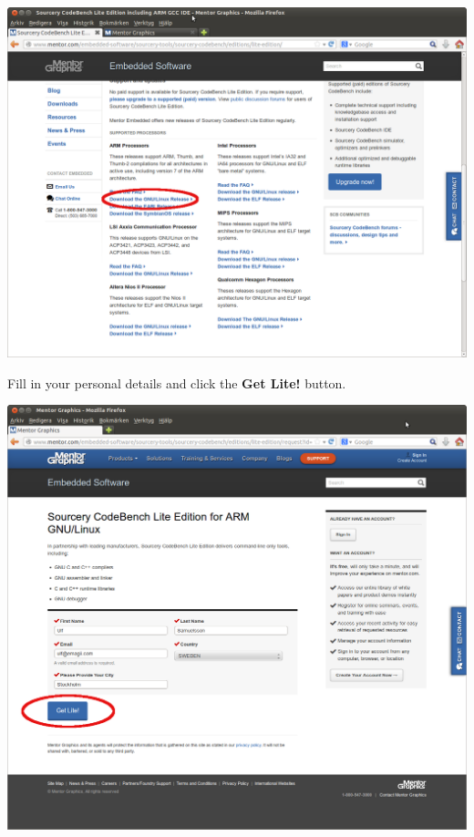 \begin{center}
  \includegraphics[width=\textwidth]{labs/codesourcery/Gnu_Linux.png}
\end{center}
\clearpage

Fill in your personal details and click the {\bf Get Lite!} button.
\\

\begin{center}
  \includegraphics[width=\textwidth]{labs/codesourcery/Mentor_User_Info.png}
\end{center}

